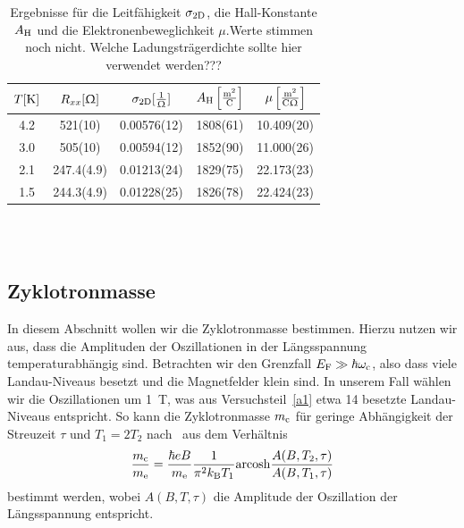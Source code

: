 \documentclass[paper=a4,fontsize=10pt,DIV=18,twocolumn,parskip=half]{scrartcl}
\numberwithin{equation}{section}    %
\newcommand{\note}[1]{{\color{red}#1??}}
\newcommand{\kor}[1]{{\color{darkgreen}#1}}
\begin{document}
\begin{table}[htp]
	\begin{center}
		\kor{\begin{tabular}{ccccc}
			\hline
			$T[\rm K]$ & $R_{xx}[\Upomega]$ & $\sigma_{\rm 2D}[\frac{1}{\Upomega}]$ & $A_{\rm H}\left[ \frac{\mathrm{m}^2}{\mathrm{C}} \right]$ & $\mu \left[ \frac{\mathrm{m}^2}{\mathrm{C}\Upomega} \right]$\\
			\hline
			4.2 & 521(10) & 0.00576(12) & 1808(61) & 10.409(20)\\
			3.0 & 505(10) & 0.00594(12) & 1852(90) & 11.000(26)\\
			2.1 & 247.4(4.9) & 0.01213(24) & 1829(75) & 22.173(23)\\
			1.5 & 244.3(4.9) & 0.01228(25) & 1826(78) & 22.424(23)\\
			\hline
		\end{tabular}}
		\caption{Ergebnisse für die Leitfähigkeit $\sigma_{\rm 2D}$, die Hall-Konstante $A_{\rm H}$ und die Elektronenbeweglichkeit $\mu$.\note{Werte stimmen noch nicht. Welche Ladungsträgerdichte sollte hier verwendet werden?}}
		\label{tab.leithallbeweg}
	\end{center}
\end{table}
%
~~~~~~~~~~~~~~~~~~~~~~~~~~~~~~~~~~~~~~~~~~~~~~~~~~~~~~~~~~~~~~~~~~~~~~~~~~~~~
\subsection{Zyklotronmasse}
\label{a4}

In diesem Abschnitt wollen wir die Zyklotronmasse bestimmen. Hierzu nutzen wir aus, dass die Amplituden der Oszillationen in der Längsspannung temperaturabhängig sind. Betrachten wir den Grenzfall $E_{\rm F} \gg \hbar\omega_{\rm c}$, also dass viele Landau-Niveaus besetzt und die Magnetfelder klein sind. \kor{In unserem Fall wählen wir die Oszillationen um \SI{1}{\tesla}, was aus Versuchsteil~\ref{a1} etwa 14 besetzte Landau-Niveaus entspricht.} So kann die Zyklotronmasse $m_{\rm c}$ für geringe Abhängigkeit der Streuzeit $\tau$ und $T_{1} = 2T_{2}$ nach~\citet{ando} aus dem Verhältnis
\begin{equation}
	\frac{m_{\rm c}}{m_{\rm e}} = \frac{\hbar e B}{m_{\rm e}} \frac{1}{\pi^2 k_{\rm B} T_{1}}\mathrm{arcosh}\frac{A(B,T_2,\tau)}{A(B,T_1,\tau)}
	\label{eq:zyklotronmasse}
\end{equation}
bestimmt werden, wobei $A(B,T,\tau)$ die Amplitude der Oszillation der Längsspannung entspricht.
\end{document}
